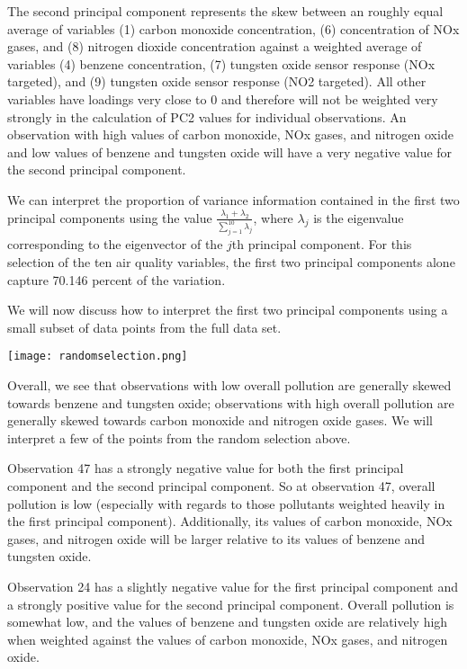 \documentclass{article}
\begin{document}
\smallskip

The second principal component represents the skew between an roughly equal average of variables (1) carbon monoxide concentration, (6) concentration of NOx gases, and (8) nitrogen dioxide concentration against a weighted average of variables (4) benzene concentration, (7) tungsten oxide sensor response (NOx targeted), and (9) tungsten oxide sensor response (NO2 targeted). All other variables have loadings very close to 0 and therefore will not be weighted very strongly in the calculation of PC2 values for individual observations. An observation with high values of carbon monoxide, NOx gases, and nitrogen oxide and low values of benzene and tungsten oxide will have a very negative value for the second principal component.

\smallskip

We can interpret the proportion of variance information contained in the first two principal components using the value $\frac{\lambda_1 + \lambda_2}{\sum^{10}_{j=1}\lambda_j}$, where $\lambda_j$ is the eigenvalue corresponding to the eigenvector of the $j$th principal component. For this selection of the ten air quality variables, the first two principal components alone capture 70.146 percent of the variation.

\smallskip

We will now discuss how to interpret the first two principal components using a small subset of data points from the full data set. 

\texttt{[image: randomselection.png]}

Overall, we see that observations with low overall pollution are generally skewed towards benzene and tungsten oxide; observations with high overall pollution are generally skewed towards carbon monoxide and nitrogen oxide gases. We will interpret a few of the points from the random selection above.

\smallskip

Observation 47 has a strongly negative value for both the first principal component and the second principal component. So at observation 47, overall pollution is low (especially with regards to those pollutants weighted heavily in the first principal component). Additionally, its values of carbon monoxide, NOx gases, and nitrogen oxide will be larger relative to its values of benzene and tungsten oxide.

\smallskip

Observation 24 has a slightly negative value for the first principal component and a strongly positive value for the second principal component. Overall pollution is somewhat low, and the values of benzene and tungsten oxide are relatively high when weighted against the values of carbon monoxide, NOx gases, and nitrogen oxide.
\end{document}
